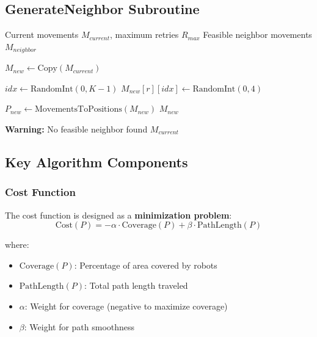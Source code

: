 \subsection{GenerateNeighbor Subroutine}

\begin{algorithm}[H]
\caption{Generate Feasible Neighbor Solution}
\begin{algorithmic}[1]
\Require Current movements $M_{current}$, maximum retries $R_{max}$
\Ensure Feasible neighbor movements $M_{neighbor}$

    \State $M_{new} \gets \text{Copy}(M_{current})$ 
    
         
            \State $idx \gets \text{RandomInt}(0, K-1)$ 
            \State $M_{new}[r][idx] \gets \text{RandomInt}(0, 4)$ 
        \EndFor
    \EndFor
    
    \State $P_{new} \gets \text{MovementsToPositions}(M_{new})$
     
        \State \Return $M_{new}$ 
    \EndIf
\EndFor

\State \textbf{Warning:} No feasible neighbor found
\State \Return $M_{current}$ 
\end{algorithmic}
\end{algorithm}

\subsection{Key Algorithm Components}

\subsubsection{Cost Function}
The cost function is designed as a \textbf{minimization problem}:
\begin{equation}
\text{Cost}(P) = -\alpha \cdot \text{Coverage}(P) + \beta \cdot \text{PathLength}(P)
\end{equation}

where:
\begin{itemize}
    \item $\text{Coverage}(P)$: Percentage of area covered by robots
    \item $\text{PathLength}(P)$: Total path length traveled
    \item $\alpha$: Weight for coverage (negative to maximize coverage)
    \item $\beta$: Weight for path smoothness
\end{itemize}

